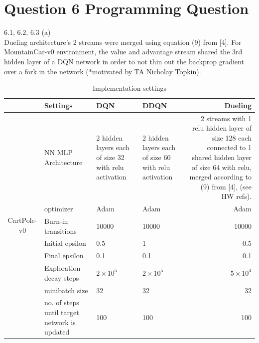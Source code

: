 \documentclass[12pt]{article}
\begin{document}
\section*{Question 6 Programming Question}
    \begin{tcolorbox}[fit,height=22cm, width=\textwidth, blank, borderline={1pt}{-2pt},nobeforeafter]
    {\large 6.1, 6.2, 6.3 (a)}\\
    {\large *Dueling architecture's 2 streams were merged using equation (9) from [4]. For MountainCar-v0 environment, the value and advantage stream shared the 3rd hidden layer of a DQN network in order to not thin out the backprop gradient over a fork in the network (*motivated by TA Nicholay Topkin).}
	\begin{table}[H]
		\centering
		\caption{Implementation settings}
		\begin{tabular}{|c|p{7.785em}|l|l|r|}
			\cline{2-5}    \multicolumn{1}{r|}{} & Settings & \multicolumn{1}{p{7.93em}|}{DQN} & \multicolumn{1}{p{7.93em}|}{DDQN} & \multicolumn{1}{p{7.5em}|}{Dueling} \\
			\hline
			\multirow{10}[20]{*}{\begin{sideways}CartPole-v0\end{sideways}} & NN MLP Architecture  & \multicolumn{1}{p{7.93em}|}{2 hidden layers each of size 32 with relu activation} & \multicolumn{1}{p{7.93em}|}{2 hidden layers each of size 60 with relu activation} & \multicolumn{1}{p{7.93em}|}{2 streams with 1 relu hidden layer of size 128 each connected to 1 shared hidden layer of size 64 with relu, merged according to (9) from [4], (see HW refs).} \\
			\cline{2-5}          & optimizer & \multicolumn{1}{p{7.93em}|}{Adam} & \multicolumn{1}{p{7.93em}|}{Adam} & \multicolumn{1}{p{7.93em}|}{Adam} \\
			\cline{2-5}          & Burn-in transitions & 10000 & 10000 &  10000 \\
			\cline{2-5}          & Initial epsilon & 0.5   & 1     & 0.5 \\
			\cline{2-5}          & Final epsilon & 0.1   & 0.1   & 0.1 \\
			\cline{2-5}          & Exploration decay steps & \multicolumn{1}{p{7.93em}|}{$2\times10^5$} & \multicolumn{1}{p{7.93em}|}{$2\times10^5$} & \multicolumn{1}{p{7.93em}|}{$5\times10^4$} \\
			\cline{2-5}          & minibatch size & 32    & 32    & 32  \\
			\cline{2-5}          & no. of steps until target network is updated & 100   & 100   & 100  \\

\end{tabular}
\end{table}
\end{tcolorbox}
\end{document}
